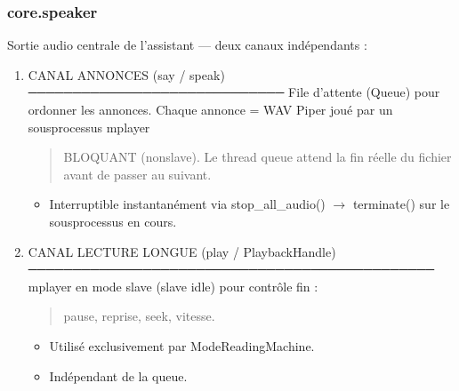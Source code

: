 \documentclass[letterpaper,10pt,french]{sphinxmanual}
\begin{document}
\subsubsection{core.speaker}
\label{\detokenize{api/core:core-speaker}}
\sphinxAtStartPar
Sortie audio centrale de l’assistant — deux canaux indépendants :
\begin{enumerate}
%
\item {} 
\sphinxAtStartPar
CANAL ANNONCES  (say / speak)
─────────────────────────────
\sphinxhyphen{} File d’attente (Queue) pour ordonner les annonces.
\sphinxhyphen{} Chaque annonce = WAV Piper joué par un sous\sphinxhyphen{}processus mplayer
\begin{quote}

\sphinxAtStartPar
BLOQUANT (non\sphinxhyphen{}slave). Le thread queue attend la fin réelle du
fichier avant de passer au suivant.
\end{quote}
\begin{itemize}
\item {} 
\sphinxAtStartPar
Interruptible instantanément via stop\_all\_audio() \(\rightarrow\)
terminate() sur le sous\sphinxhyphen{}processus en cours.

\end{itemize}

\item {} 
\sphinxAtStartPar
CANAL LECTURE LONGUE  (play / PlaybackHandle)
──────────────────────────────────────────────
\sphinxhyphen{} mplayer en mode slave (\sphinxhyphen{}slave \sphinxhyphen{}idle) pour contrôle fin :
\begin{quote}

\sphinxAtStartPar
pause, reprise, seek, vitesse.
\end{quote}
\begin{itemize}
\item {} 
\sphinxAtStartPar
Utilisé exclusivement par ModeReadingMachine.

\item {} 
\sphinxAtStartPar
Indépendant de la queue.

\end{itemize}

\end{enumerate}
\end{document}
